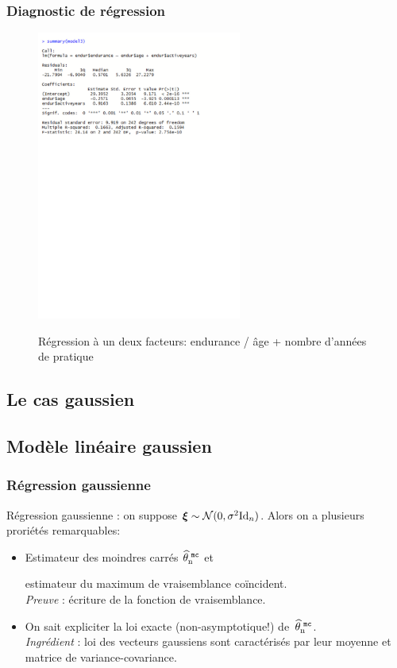 \begin{frame}
\frametitle{Diagnostic de régression}
\begin{figure}
  \centering
  \includegraphics[width=0.6\textwidth]{summarymodel3}\\
  \caption{Régression à un deux facteurs: endurance / âge + nombre d'années de pratique}
\end{figure}
\end{frame}



\subsection{Le cas gaussien}








\subsection{Modèle linéaire gaussien}

\begin{frame}
\frametitle{Régression gaussienne} \alert{Régression gaussienne} : on
suppose $\boldsymbol{\xi} \sim {\mathcal
N}(0,\sigma^2\mathrm{Id}_n)$. Alors on a plusieurs proriétés
remarquables:
\begin{itemize}
\item Estimateur des moindres carrés $\operatorname{\widehat \theta_n^{\,\,{\tt mc}}}$ et

estimateur du maximum de vraisemblance
\alert{coïncident}.\\\vspace{1mm} {\it Preuve} : écriture de
la fonction de vraisemblance.
\item  On sait expliciter la loi \alert{ exacte} (non-asymptotique!)
de~$\operatorname{\widehat \theta_n^{\,\,{\tt mc}}}$.\\\vspace{1mm} {\it Ingrédient} : \alert{loi des
vecteurs gaussiens sont caractérisés par leur moyenne et matrice de
variance-covariance}.
\end{itemize}
\end{frame}

